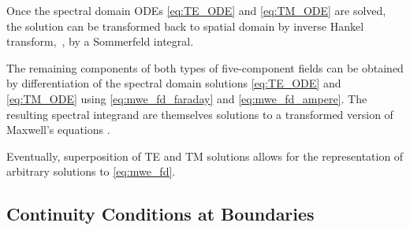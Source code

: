 Once the spectral domain \acp{ODE} \eqref{eq:TE_ODE} and \eqref{eq:TM_ODE}
are solved, the solution can be transformed back to spatial domain by
inverse Hankel transform,~\ie, by a Sommerfeld integral.

The remaining components of both types of five-component fields can be obtained
by differentiation of the spectral domain solutions \eqref{eq:TE_ODE} and
\eqref{eq:TM_ODE} using \eqref{eq:mwe_fd_faraday} and \eqref{eq:mwe_fd_ampere}.
The resulting spectral integrand are themselves solutions to a transformed
version of Maxwell's equations \cite[p75]{Chew1999}.

Eventually, superposition of \ac{TE} and \ac{TM} solutions allows for the
representation of arbitrary solutions to \eqref{eq:mwe_fd}.











\subsection{Continuity Conditions at Boundaries}
\label{subsec:continuity_at_interfaces}

